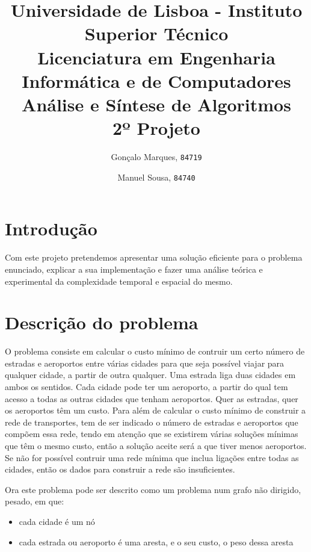 \documentclass{scrartcl}
\begin{document}

\title{
	\textnormal{
	\LARGE Universidade de Lisboa - Instituto Superior Técnico\\
	\Large Licenciatura em Engenharia Informática e de Computadores\\
	\Large Análise e Síntese de Algoritmos
\\}
	\LARGE2º Projeto
	\vspace{-1ex}
	}
\author{Gonçalo Marques,
	\texttt{84719}
	\and
	Manuel Sousa,
	\texttt{84740}
}
\date{	\vspace{-1ex}
		\vspace{-4ex}
	}
\maketitle

\section*{Introdução}
Com este projeto pretendemos apresentar uma solução eficiente para o problema enunciado, explicar a sua implementação e fazer uma análise teórica e experimental da complexidade temporal e espacial do mesmo.

\section*{Descrição do problema}
O problema consiste em calcular o custo mínimo de contruir um certo número de estradas e aeroportos entre várias cidades para que seja possível viajar para qualquer cidade, a partir de outra qualquer. Uma estrada liga duas cidades em ambos os sentidos. Cada cidade pode ter um aeroporto, a partir do qual tem acesso a todas as outras cidades que tenham aeroportos. Quer as estradas, quer os aeroportos têm um custo. Para além de calcular o custo mínimo de construir a rede de transportes, tem de ser indicado o número de estradas e aeroportos que compõem essa rede, tendo em atenção que se existirem várias soluções mínimas que têm o mesmo custo, então a solução aceite será a que tiver menos aeroportos. Se não for possível contruir uma rede mínima que inclua ligações entre todas as cidades, então os dados para construir a rede são insuficientes.

Ora este problema pode ser descrito como um problema num grafo não dirigido, pesado, em que:
\begin{itemize}
\setlength\itemsep{-0.5ex}
\item cada cidade é um nó
\item cada estrada ou aeroporto é uma aresta, e o seu custo, o peso dessa aresta
\end{itemize}
\end{document}
